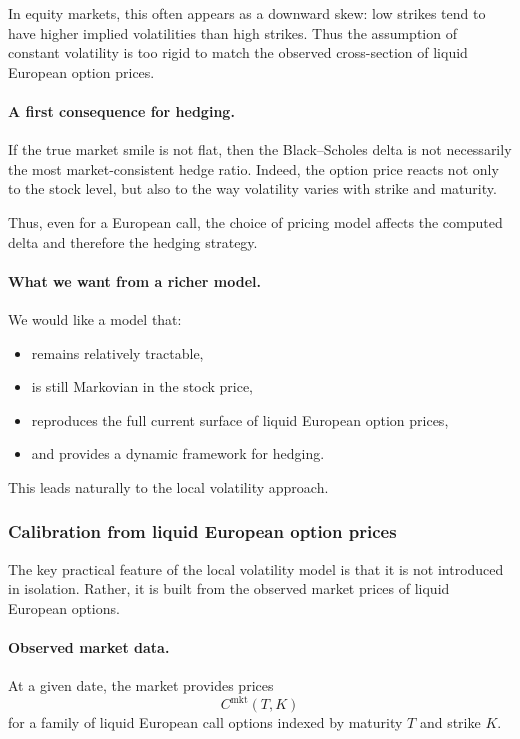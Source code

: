 \documentclass[11pt]{article}
\theoremstyle{plain}
\theoremstyle{definition}
\theoremstyle{remark}
\begin{document}
In equity markets, this often appears as a downward skew:
low strikes tend to have higher implied volatilities than high strikes.
Thus the assumption of constant volatility is too rigid to match the
observed cross-section of liquid European option prices.

\paragraph{A first consequence for hedging.}
If the true market smile is not flat, then the Black--Scholes delta is
not necessarily the most market-consistent hedge ratio.
Indeed, the option price reacts not only to the stock level, but also to
the way volatility varies with strike and maturity.

Thus, even for a European call, the choice of pricing model affects the
computed delta and therefore the hedging strategy.

\paragraph{What we want from a richer model.}
We would like a model that:
\begin{itemize}[leftmargin=1.4em]
    \item remains relatively tractable,
    \item is still Markovian in the stock price,
    \item reproduces the full current surface of liquid European option
    prices,
    \item and provides a dynamic framework for hedging.
\end{itemize}

This leads naturally to the local volatility approach.

\subsubsection{Calibration from liquid European option prices}

The key practical feature of the local volatility model is that it is
not introduced in isolation.
Rather, it is built from the observed market prices of liquid European
options.

\paragraph{Observed market data.}
At a given date, the market provides prices
\[
C^{\mathrm{mkt}}(T,K)
\]
for a family of liquid European call options indexed by maturity \(T\)
and strike \(K\).
\end{document}

